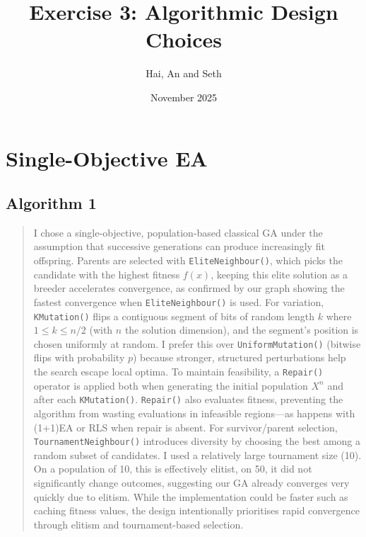 \documentclass[11pt]{article}
\title{Exercise 3: Algorithmic Design Choices}
\author{Hai, An and Seth}
\date{November 2025}
\begin{document}
    \maketitle

    \section{Single-Objective EA}
    \subsection{Algorithm 1}
    \begin{quote}
        \qquad I chose a single-objective, population-based classical GA under the assumption that successive generations can produce increasingly fit offspring. Parents are selected with \texttt{EliteNeighbour()}, which picks the candidate with the highest fitness \(f(x)\), keeping this elite solution as a breeder accelerates convergence, as confirmed by our graph showing the fastest convergence when \texttt{EliteNeighbour()} is used. For variation, \texttt{KMutation()} flips a contiguous segment of bits of random length \(k\) where \(1 \le k \le n/2\) (with \(n\) the solution dimension), and the segment’s position is chosen uniformly at random. I prefer this over \texttt{UniformMutation()} (bitwise flips with probability \(p\)) because stronger, structured perturbations help the search escape local optima. To maintain feasibility, a \texttt{Repair()} operator is applied both when generating the initial population \(X^n\) and after each \texttt{KMutation()}. \texttt{Repair()} also evaluates fitness, preventing the algorithm from wasting evaluations in infeasible regions—as happens with (1+1)EA or RLS when repair is absent. For survivor/parent selection, \texttt{TournamentNeighbour()} introduces diversity by choosing the best among a random subset of candidates. I used a relatively large tournament size (10). On a population of 10, this is effectively elitist, on 50, it did not significantly change outcomes, suggesting our GA already converges very quickly due to elitism. While the implementation could be faster such as caching fitness values, the design intentionally prioritises rapid convergence through elitism and tournament-based selection.
    \end{quote}
\end{document}
